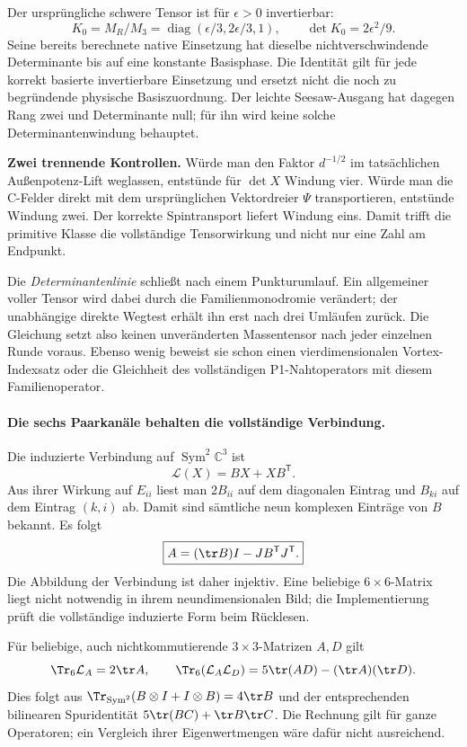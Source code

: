 Der ursprüngliche schwere Tensor ist für $\epsilon>0$ invertierbar:
\[
 K_0=M_R/M_3=\operatorname{diag}(\epsilon/3,2\epsilon/3,1),
 \qquad \det K_0=2\epsilon^2/9.
\]
Seine bereits berechnete native Einsetzung hat dieselbe nichtverschwindende
Determinante bis auf eine konstante Basisphase. Die Identität gilt für jede
korrekt basierte invertierbare Einsetzung und ersetzt nicht die noch zu
begründende physische Basiszuordnung. Der leichte Seesaw-Ausgang hat dagegen
Rang zwei und Determinante null; für ihn wird keine solche
Determinantenwindung behauptet.

\textbf{Zwei trennende Kontrollen.} Würde man den Faktor $d^{-1/2}$ im
tatsächlichen Außenpotenz-Lift weglassen, entstünde für $\det X$ Windung
vier. Würde man die C-Felder direkt mit dem ursprünglichen Vektordreier
$\Psi$ transportieren, entstünde Windung zwei. Der korrekte Spintransport
liefert Windung eins. Damit trifft die primitive Klasse die vollständige
Tensorwirkung und nicht nur eine Zahl am Endpunkt.

Die \emph{Determinantenlinie} schließt nach einem Punkturumlauf. Ein
allgemeiner voller Tensor wird dabei durch die Familienmonodromie verändert;
der unabhängige direkte Wegtest erhält ihn erst nach drei Umläufen zurück.
Die Gleichung setzt also keinen unveränderten Massentensor nach jeder
einzelnen Runde voraus. Ebenso wenig beweist sie schon einen
vierdimensionalen Vortex-Indexsatz oder die Gleichheit des vollständigen
P1-Nahtoperators mit diesem Familienoperator.

\paragraph{Die sechs Paarkanäle behalten die vollständige Verbindung.}
Die induzierte Verbindung auf $\operatorname{Sym}^2\mathbb C^3$ ist
\begin{equation}\label{eq:sixconnection}
 \mathcal L(X)=BX+XB^{\mathsf T}.
\end{equation}
Aus ihrer Wirkung auf $E_{ii}$ liest man $2B_{ii}$ auf dem diagonalen
Eintrag und $B_{ki}$ auf dem Eintrag $(k,i)$ ab. Damit sind sämtliche neun
komplexen Einträge von $B$ bekannt. Es folgt
\[
 \boxed{A=(\tr B)I-JB^{\mathsf T}J^{\mathsf T}.}
\]
Die Abbildung der Verbindung ist daher injektiv. Eine beliebige
$6\times6$-Matrix liegt nicht notwendig in ihrem neundimensionalen Bild;
die Implementierung prüft die vollständige induzierte Form beim Rücklesen.

Für beliebige, auch nichtkommutierende $3\times3$-Matrizen $A,D$ gilt
\begin{equation}\label{eq:pairtraces}
 \Tr_6\mathcal L_A=2\tr A,\qquad
 \Tr_6(\mathcal L_A\mathcal L_D)=5\tr(AD)-(\tr A)(\tr D).
\end{equation}
Dies folgt aus
$\Tr_{\mathrm{Sym}^2}(B\otimes I+I\otimes B)=4\tr B$
und der entsprechenden bilinearen Spuridentität
$5\tr(BC)+\tr B\tr C$. Die Rechnung gilt für ganze Operatoren;
ein Vergleich ihrer Eigenwertmengen wäre dafür nicht ausreichend.

